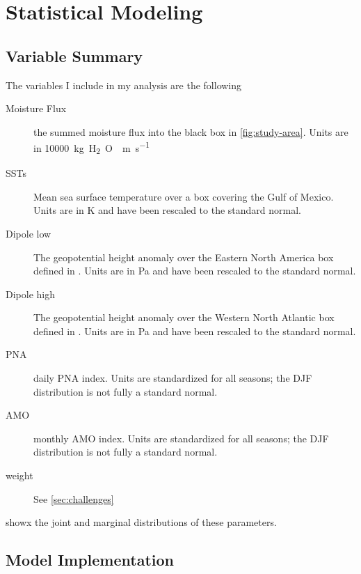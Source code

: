 \documentclass[12pt]{article}
\begin{document}
\section{Statistical Modeling}


\subsection{Variable Summary} \label{sec:var-summary}


The variables I include in my analysis are the following
\begin{description}
    \item[Moisture Flux] the summed moisture flux into the black box in \cref{fig:study-area}. Units are in \SI{10000}{\kilo\gram H_2O \per\meter\per\second}
    \item[SSTs] Mean sea surface temperature over a box covering the Gulf of Mexico. Units are in \si{\kelvin} and have been rescaled to the standard normal.
    \item[Dipole low] The geopotential height anomaly over the Eastern North America box defined in \citet{Farnham2016}. Units are in \si{\pascal} and have been rescaled to the standard normal.
    \item[Dipole high] The geopotential height anomaly over the Western North Atlantic box defined in \citet{Farnham2016}. Units are in \si{\pascal} and have been rescaled to the standard normal.
    \item[PNA] daily PNA index. Units are standardized for all seasons; the DJF distribution is not fully a standard normal.
    \item[AMO] monthly AMO index. Units are standardized for all seasons; the DJF distribution is not fully a standard normal.
    \item[weight] See \cref{sec:challenges}
\end{description}
 showx the joint and marginal distributions of these parameters.

\subsection{Model Implementation}
\end{document}
